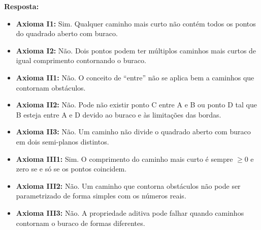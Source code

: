 \documentclass[12pt,a4paper]{article}
\newcommand{\answer}[1]{\textcolor{answer}{#1}}
\begin{document}
\begin{enumerate}[label= (\roman*)]
        \answer{
            \textbf{Resposta:}
            \begin{itemize}
                \item \textbf{Axioma I1:} Sim. Qualquer caminho mais curto não contém todos os pontos do quadrado aberto com buraco.
                \item \textbf{Axioma I2:} Não. Dois pontos podem ter múltiplos caminhos mais curtos de igual comprimento contornando o buraco.
                \item \textbf{Axioma II1:} Não. O conceito de ``entre'' não se aplica bem a caminhos que contornam obstáculos.
                \item \textbf{Axioma II2:} Não. Pode não existir ponto C entre A e B ou ponto D tal que B esteja entre A e D devido ao buraco e às limitações das bordas.
                \item \textbf{Axioma II3:} Não. Um caminho não divide o quadrado aberto com buraco em dois semi-planos distintos.
                \item \textbf{Axioma III1:} Sim. O comprimento do caminho mais curto é sempre $\geq 0$ e zero se e só se os pontos coincidem.
                \item \textbf{Axioma III2:} Não. Um caminho que contorna obstáculos não pode ser parametrizado de forma simples com os números reais.
                \item \textbf{Axioma III3:} Não. A propriedade aditiva pode falhar quando caminhos contornam o buraco de formas diferentes.
            \end{itemize} 
        }
    \end{enumerate}
\end{document}
